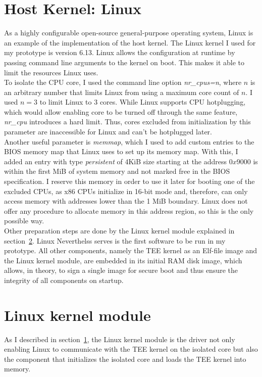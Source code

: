 \section{Host Kernel: Linux}
\label{sec:implementation:hostKernel}

As a highly configurable open-source general-purpose operating system, Linux is
an example of the implementation of the host kernel. The Linux kernel I used for
my prototype is version 6.13. Linux allows the configuration at runtime by
passing command line arguments to the kernel on boot. This makes it able to
limit the resources Linux uses. \\

To isolate the CPU core, I used the command line option \textit{nr\_cpus=n},
where $n$ is an arbitrary number that limits Linux from using a maximum core
count of $n$. I used $n=3$ to limit Linux to 3 cores. While Linux supports CPU
hotplugging, which would allow enabling core to be turned off through
the same feature, \textit{nr\_cpu} introduces a hard limit. Thus, cores excluded
from initialization by this parameter are inaccessible for Linux and can't be
hotplugged later. \\

Another useful parameter is \textit{memmap}, which I used to add custom entries
to the BIOS memory map that Linux uses to set up its memory map. With this, I
added an entry with type \textit{persistent} of 4KiB size starting at the
address $0x9000$ is within the first MiB of system memory and not marked free in
the BIOS specification. I reserve this memory in order to use it
later for booting one of the excluded CPUs, as x86 CPUs initialize in 16-bit
mode and, therefore, can only access memory with addresses lower than the 1 MiB
boundary. Linux does not offer any procedure to allocate memory in this address
region, so this is the only possible way. \\

Other preparation steps are done by the Linux kernel module explained in
section~\ref{sec:implementation:kmod}. Linux Neverthelss serves is the first
software to be run in my prototype. All other components, namely the TEE kernel
as an Elf-file image and the Linux kernel module, are embedded in its initial
RAM disk image, which allows, in theory, to sign a single image for secure boot
and thus ensure the integrity of all components on startup.\\

\section{Linux kernel module}
\label{sec:implementation:kmod}
As I described in section~\ref{sec:implementation:hostKernel}, the Linux kernel
module is the driver not only enabling Linux to communicate with the TEE kernel
on the isolated core but also the component that initializes the isolated core
and loads the TEE kernel into memory.\\

